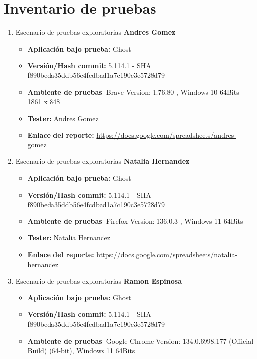 \documentclass[report,12pt]{article}
\begin{document}
\section{Inventario de pruebas}
\begin{enumerate}
    \item Escenario de pruebas exploratorias \textbf{Andres Gomez}
    \begin{itemize}
        \item \textbf{Aplicación bajo prueba:} Ghost
        \item \textbf{Versión/Hash commit:} 5.114.1 - SHA f890beda35ddb56e4fcdbad1a7c190c3e5728d79
        \item \textbf{Ambiente de pruebas:} Brave Version: 1.76.80 , Windows 10 64Bits 1861 x 848
        \item \textbf{Tester:} Andres Gomez
        \item \textbf{Enlace del reporte:} \href{https://docs.google.com/spreadsheets/d/1AW5Uuod1t0fUaCuIDGt3VsMxNsfL1ElC/edit?gid=2070240166#gid=2070240166}{https://docs.google.com/spreadsheets/andres-gomez}
    \end{itemize}
    \item Escenario de pruebas exploratorias \textbf{Natalia Hernandez}
    \begin{itemize}
        \item \textbf{Aplicación bajo prueba:} Ghost
        \item \textbf{Versión/Hash commit:} 5.114.1 - SHA f890beda35ddb56e4fcdbad1a7c190c3e5728d79
        \item \textbf{Ambiente de pruebas:} Firefox Version: 136.0.3 , Windows 11 64Bits
        \item \textbf{Tester:} Natalia Hernandez
        \item \textbf{Enlace del reporte:} \href{https://docs.google.com/spreadsheets/d/1AW5Uuod1t0fUaCuIDGt3VsMxNsfL1ElC/edit?gid=978517391#gid=978517391}{https://docs.google.com/spreadsheets/natalia-hernandez}
    \end{itemize}
    \item Escenario de pruebas exploratorias \textbf{Ramon Espinosa}
    \begin{itemize}
        \item \textbf{Aplicación bajo prueba:} Ghost
        \item \textbf{Versión/Hash commit:} 5.114.1 - SHA f890beda35ddb56e4fcdbad1a7c190c3e5728d79
        \item \textbf{Ambiente de pruebas:} Google Chrome Version: 134.0.6998.177 (Official Build) (64-bit), Windows 11 64Bits

\end{itemize}
\end{enumerate}
\end{document}
